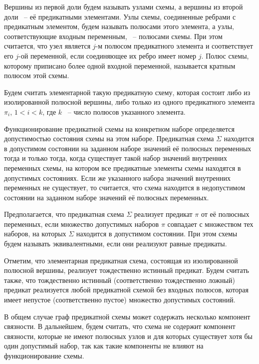 \documentclass[12pt]{extarticle}
\begin{document}
Вершины из первой доли будем называть узлами схемы, а вершины из второй доли ~-- её предикатными элементами. 
Узлы схемы, соединенные ребрами с предикатным элементом, будем называть полюсами этого элемента, 
а узлы, соответствующие входным переменным, ~-- полюсами схемы.
При этом считается, что узел является $j$-м полюсом предикатного элемента и соответствует 
его $j$-ой переменной, если соединяющее их ребро имеет номер $j$. Полюс схемы, которому приписано 
более одной входной переменной, называется кратным полюсом этой схемы. 

Будем считать элементарной такую предикатную схему, которая состоит либо из изолированной полюсной вершины, 
либо только из одного предикатного элемента $\pi_i$, $1 < i < k$, где $k$ ~-- число полюсов указанного элемента.

Функционирование предикатной схемы на конкретном наборе определяется допустимостью состояния схемы на этом наборе.
Предикатная схема $\Sigma$ находится в допустимом состоянии на 
заданном наборе значений её полюсных переменных тогда и только тогда, 
когда существует такой набор значений внутренних переменных схемы, на котором все предикатные элементы схемы находятся в допустимых состояниях. 
Если же указанного набора значений внутренних переменных не существует, то считается, что схема находится в недопустимом состоянии на 
заданном наборе значений её полюсных переменных.

Предполагается, что предикатная схема $\Sigma$ реализует предикат $\pi$ от её полюсных переменных, 
если множество допустимых наборов $\pi$ 
совпадает с множеством тех наборов, на которых $\Sigma$ находится в допустимом состоянии. 
При этом схемы будем называть эквивалентными, если они реализуют равные предикаты. 

Отметим, что элементарная предикатная схема, состоящая из изолированной полюсной вершины, 
реализует тождественно истинный предикат.
 Будем считать также, что тождественно истинный (соответственно тождественно ложный)
 предикат реализуется любой предикатной схемой без входных полюсов, 
которая имеет непустое (соответственно пустое) множество допустимых состояний.

В общем случае граф предикатной схемы может содержать несколько компонент связности. 
В дальнейшем, будем считать, что схема не содержит компонент связности,
которые не имеют полюсных узлов и для которых существует хотя бы один допустимый набор, 
так как такие компоненты не влияют на функционирование схемы.
\end{document}
